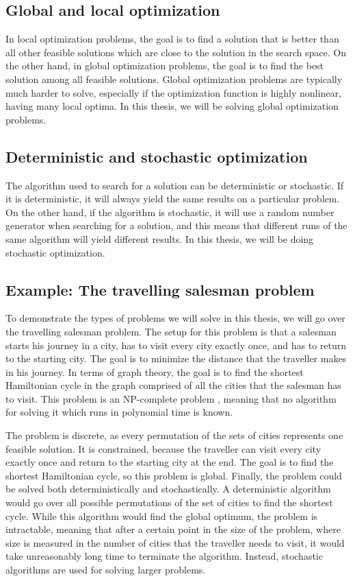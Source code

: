 \subsection{Global and local optimization}
\label{sec:global_and_local_optimization}
In local optimization problems, the goal is to find a solution that is better than all other feasible solutions which are close to the solution in the search space. On the other hand, in global optimization problems, the goal is to find the best solution among all feasible solutions. Global optimization problems are typically much harder to solve, especially if the optimization function is highly nonlinear, having many local optima. In this thesis, we will be solving global optimization problems.

\subsection{Deterministic and stochastic optimization}
\label{sec:deterministic_and_stochastic_optimization}
The algorithm used to search for a solution can be deterministic or stochastic. If it is deterministic, it will always yield the same results on a particular problem. On the other hand, if the algorithm is stochastic, it will use a random number generator when searching for a solution, and this means that different runs of the same algorithm will yield different results. In this thesis, we will be doing stochastic optimization.

\subsection{Example: The travelling salesman problem}
\label{sec:the_travelling_salesman_problem}
To demonstrate the types of problems we will solve in this thesis, we will go over the travelling salesman problem. The setup for this problem is that a salesman starts his journey in a city, has to visit every city exactly once, and has to return to the starting city. The goal is to minimize the distance that the traveller makes in his journey. In terms of graph theory, the goal is to find the shortest Hamiltonian cycle in the graph comprised of all the cities that the salesman has to visit. This problem is an NP-complete problem \citep{sipser2012computation}, meaning that no algorithm for solving it which runs in polynomial time is known.

The problem is discrete, as every permutation of the sets of cities represents one feasible solution. It is constrained, because the traveller can visit every city exactly once and return to the starting city at the end. The goal is to find the shortest Hamiltonian cycle, so this problem is global. Finally, the problem could be solved both deterministically and stochastically. A deterministic algorithm would go over all possible permutations of the set of cities to find the shortest cycle. While this algorithm would find the global optimum, the problem is intractable, meaning that after a certain point in the size of the problem, where size is measured in the number of cities that the traveller needs to visit, it would take unreasonably long time to terminate the algorithm. Instead, stochastic algorithms are used for solving larger problems.

